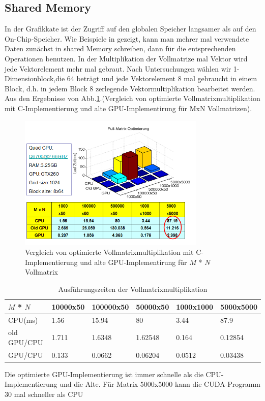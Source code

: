 \subsection{Shared Memory}
In der Grafikkate ist der Zugriff auf den globalen Speicher langsamer als auf den On-Chip-Speicher.  Wie Beispiele in \cite{cudapg} gezeigt, kann man mehrer mal verwendete Daten zunächst in shared Memory schreiben, dann für die entsprechenden Operationen benutzen. In der Multiplikation der Vollmatrize mal Vektor wird jede Vektorelement mehr mal gebraut. Nach Untersuchungen wählen wir 1-Dimensionblock,die 64 beträgt und jede Vektorelement 8 mal gebraucht in einem Block, d.h. in jedem Block 8 zerlegende Vektormultiplikation bearbeitet werden. Aus den Ergebnisse von Abb.\ref{sharememory}.(Vergleich von optimierte Vollmatrixmultiplikation mit C-Implementierung und alte GPU-Implementirung für MxN Vollmatrizen).
\begin{figure}[htbp]
\includegraphics[width=3.5in]{../xby/pic/sharememory}
\caption{Vergleich von optimierte Vollmatrixmultiplikation mit C-Implementierung und alte GPU-Implementirung für $M$ * $N$ Vollmatrix}
\label{sharememory}
\end{figure}


\begin{table}
\caption{Ausführungszeiten der Vollmatrixmultiplikation} 
\label{shared_memory}
\centering
\begin{tabular}{|p{46pt}p{28pt}p{30pt}p{28pt}p{30pt}p{30pt}|}
\toprule
	$M$ * $N$& 10000x50& 100000x50& 50000x50& 1000x1000& 5000x5000\\

\midrule
CPU(ms)& 1.56&    15.94& 				80&      3.44& 87.9\\

old GPU/CPU& 1.711& 1.6348&   1.62548&  0.164&  0.12854\\

GPU/CPU & 0.133& 0.0662&     0.06204&   0.0512& 0.03438\\
\bottomrule
\end{tabular}
\end{table}
Die optimierte GPU-Implementierung ist immer schnelle als die CPU-Implementierung  und die Alte. Für Matrix 5000x5000 kann die CUDA-Programm 30 mal schneller als CPU

